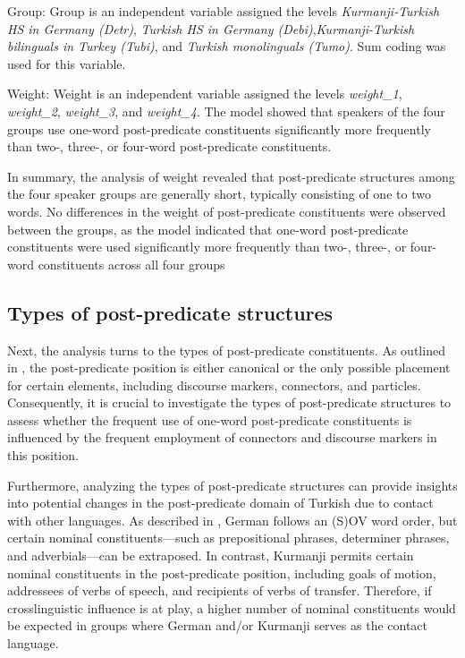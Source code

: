 Group: Group is an independent variable assigned the levels \textit{Kurmanji-Turkish HS in Germany (Detr)}, \textit{Turkish HS in Germany (Debi)},\textit{Kurmanji-Turkish bilinguals in Turkey (Tubi)}, and \textit{Turkish monolinguals (Tumo)}. Sum coding was used for this variable.

Weight: Weight is an independent variable assigned the levels \textit{weight\_1}, \textit{weight\_2}, \textit{weight\_3}, and \textit{weight\_4}. The model showed that speakers of the four groups use one-word post-predicate constituents significantly more frequently than two-, three-, or four-word post-predicate constituents.

In summary, the analysis of weight revealed that post-predicate structures among the four speaker groups are generally short, typically consisting of one to two words. No differences in the weight of post-predicate constituents were observed between the groups, as the model indicated that one-word post-predicate constituents were used significantly more frequently than two-, three-, or four-word constituents across all four groups


\subsection{Types of post-predicate structures}\label{sec:key:5.3.2}

Next, the analysis turns to the types of post-predicate constituents. As outlined in , the post-predicate position is either canonical or the only possible placement for certain elements, including discourse markers, connectors, and particles. Consequently, it is crucial to investigate the types of post-predicate structures to assess whether the frequent use of one-word post-predicate constituents is influenced by the frequent employment of connectors and discourse markers in this position.

Furthermore, analyzing the types of post-predicate structures can provide insights into potential changes in the post-predicate domain of Turkish due to contact with other languages. As described in , German follows an (S)OV word order, but certain nominal constituents—such as prepositional phrases, determiner phrases, and adverbials—can be extraposed. In contrast, Kurmanji permits certain nominal constituents in the post-predicate position, including goals of motion, addressees of verbs of speech, and recipients of verbs of transfer. Therefore, if crosslinguistic influence is at play, a higher number of nominal constituents would be expected in groups where German and/or Kurmanji serves as the contact language.

